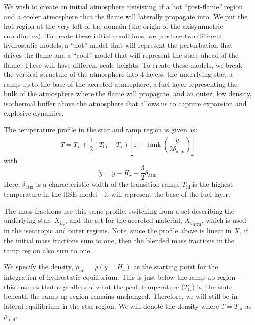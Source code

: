 \documentclass[preprint,times,tighten]{aastex63}
\begin{document}
We wish to create an initial atmosphere consisting of a hot
``post-flame'' region and a cooler atmosphere that the flame will
laterally propagate into.  We put the hot region at the very left of
the domain (the origin of the axisymmetric coordinates).  To create
these initial conditions, we produce two different hydrostatic models,
a ``hot'' model that will represent the perturbation that drives the
flame and a ``cool'' model that will represent the state ahead of the
flame.  These will have different scale heights.  To create these
models, we break the vertical structure of the atmosphere into 4
layers: the underlying star, a ramp-up to the base of the
accreted atmosphere, a fuel layer representing the bulk of the
atmosphere where the flame will propagate, and an outer, low density,
isothermal buffer above the atmosphere that allows us
to capture expansion and explosive dynamics.  

The temperature profile in the star and ramp region is given as:
\begin{equation}
T = T_\star + \frac{1}{2} (T_\mathrm{hi} - T_\star) \left [ 1 + \tanh\left( \frac{\tilde{y}}{2 \delta_\mathrm{atm}} \right ) \right ]
\end{equation}
with
\begin{equation}
\tilde{y} = y - H_\star - \frac{3}{2} \delta_\mathrm{atm}
\end{equation}
Here, $\delta_\mathrm{atm}$ is a characteristic width of the transition
ramp, $T_\mathrm{hi}$ is the highest temperature in the HSE model---it
will represent the base of the fuel layer.

The mass fractions use this same profile, switching from a set
describing the underlying star, ${X_k}_\star$, and the set for the
accreted material, ${X_k}_\mathrm{atm}$, which is used in the
isentropic and outer regions.  Note, since the profile above is
linear in $X$, if the initial mass fractions sum to one, then the blended
mass fractions in the ramp region also sum to one.

We specify the density, $\rho_\mathrm{int} = \rho(y = H_\star)$ as the
starting point for the integration of hydrostatic equilibrium.  This
is just below the ramp-up region---this ensures that regardless of
what the peak temperature ($T_\mathrm{hi}$) is, the state beneath the
ramp-up region remains unchanged.  Therefore, we will still be in
lateral equilibrium in the star region.  We will denote the density
where $T = T_\mathrm{hi}$ as $\rho_\mathrm{fuel}$.
\end{document}
